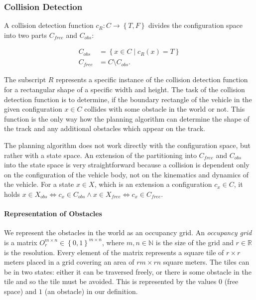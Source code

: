 \subsubsection{Collision Detection}

A collision detection function $c_{R}: C \rightarrow \left\{T, F\right\}$ divides the configuration space into two parts $C_{free}$ and $C_{obs}$:

\begin{equation*}
\begin{aligned}
	C_{obs} &= \left\{x\in C \mid c_{R}(x)=T\right\} \\
	C_{free} &= C \setminus C_{obs}.
\end{aligned}
\end{equation*}

The subscript $R$ represents a specific instance of the collision detection function for a rectangular shape of a specific width and height. The task of the collision detection function is to determine, if the boundary rectangle of the vehicle in the given configuration $x\in C$ collides with some obstacle in the world or not. This function is the only way how the planning algorithm can determine the shape of the track and any additional obstacles which appear on the track.

The planning algorithm does not work directly with the configuration space, but rather with a state space. An extension of the partitioning into $C_{free}$ and $C_{obs}$ into the state space is very straightforward because a collision is dependent only on the configuration of the vehicle body, not on the kinematics and dynamics of the vehicle. For a state $x\in X$, which is an extension a configuration $c_x \in C$, it holds $x\in X_{obs} \iff c_x\in C_{obs} \wedge x\in X_{free} \iff c_x\in C_{free}$.

\paragraph{Representation of Obstacles}
We represent the obstacles in the world as an occupancy grid. An \textit{occupancy grid} is a matrix $O_r^{m\times n}\in \left\{0, 1\right\}^{m\times n}$, where $m,n\in\mathbb{N}$ is the size of the grid and $r\in\mathbb{R}$ is the resolution. Every element of the matrix represents a square tile of $r\times r$ meters placed in a grid covering an area of $rm\times rn$ square meters. The tiles can be in two states: either it can be traversed freely, or there is some obstacle in the tile and so the tile must be avoided. This is represented by the values $0$ (free space) and $1$ (an obstacle) in our definition.


